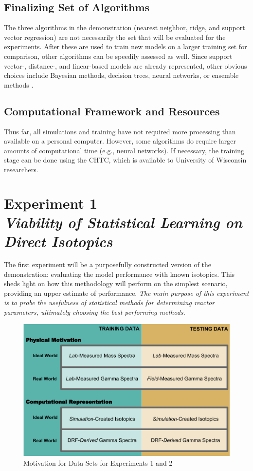 \subsection*{Finalizing Set of Algorithms}

The three algorithms in the demonstration (nearest neighbor, ridge, and support
vector regression) are not necessarily the set that will be evaluated for the
experiments. After these are used to train new models on a larger training set
for comparison, other algorithms can be speedily assessed as well.  Since
support vector-, distance-, and linear-based models are already represented,
other obvious choices include Bayesian methods, decision trees, neural
networks, or ensemble methods \cite{elements_stats}. 

\subsection*{Computational Framework and Resources}

Thus far, all simulations and training have not required more processing than
available on a personal computer. However, some algorithms do require larger
amounts of computational time (e.g., neural networks).  If necessary, the
training stage can be done using the \gls{CHTC}, which is available to
University of Wisconsin researchers. 

\section[Experiment 1: Direct Isotopics]{Experiment 1\\ 
\large{\textit{Viability of Statistical Learning on Direct Isotopics}}}
\label{sec:exp1}

The first experiment will be a purposefully constructed version of the
demonstration: evaluating the model performance with known isotopics.  This
sheds light on how this methodology will perform on the simplest scenario,
providing an upper estimate of performance.  \textit{The main purpose of this
experiment is to probe the usefulness of statistical methods for
determining reactor parameters, ultimately choosing the best performing
methods.}

\begin{figure}[!htb]
    \centering
    \includegraphics[width=0.85\linewidth]{./chapters/proposal/proposal.png}
    \caption{Motivation for Data Sets for Experiments 1 and 2}
    \label{fig:proposal}
\end{figure}

